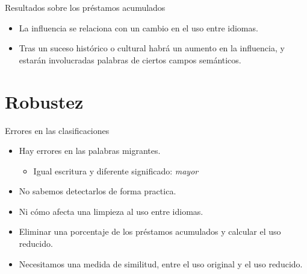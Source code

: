 \documentclass[10pt,xcolor={usenames,dvipsnames}]{beamer}
\begin{document}

\begin{frame}{Resultados sobre los préstamos acumulados}
	\begin{itemize}
		
		\item<1->[$\blacksquare$]\large{La influencia se relaciona con un  cambio en el uso entre idiomas.} %
		
		\item<2>[$\blacksquare$]\large{Tras un suceso histórico o cultural habrá un aumento en la influencia, y estarán involucradas palabras de ciertos campos semánticos.} 
		

	\end{itemize}
\end{frame}


\section{Robustez} 

\begin{frame}[fragile]{Errores en las clasificaciones}
	
	\begin{itemize}
		\item <1->[$\blacksquare$] Hay errores en las palabras migrantes.
		\begin{itemize}
			\item Igual escritura y diferente significado: \textcolor{Sepia}{\textit{mayor}}
		\end{itemize}
	
		\item <2->[$\blacksquare$]No sabemos detectarlos de forma practica.
			
		\item <3->[$\blacksquare$]Ni cómo afecta una limpieza al uso entre idiomas.
	\end{itemize}
	
	\begin{itemize}
		\item<4-> [$\blacksquare$] Eliminar una porcentaje de los préstamos acumulados y calcular el uso reducido.
		
		\item<5-> [$\blacksquare$] Necesitamos una medida de similitud, entre el uso original y el uso reducido.
		\visible<6>{
		$$
		\left\langle D \right\rangle  = \frac{1}{N}\sum_{t=1}^{N} \left| u_{t} - r_{t} \right|.
		$$
		}
	\end{itemize}
\end{frame}
\end{document}
